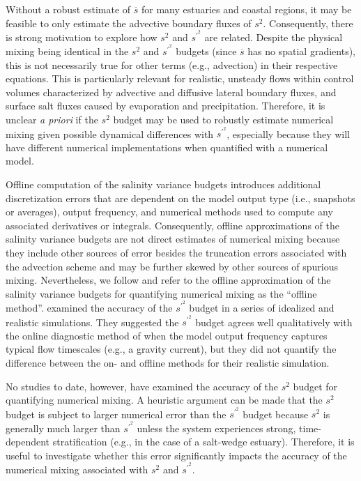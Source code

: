 Without a robust estimate of $\overline{s}$ for many estuaries and coastal regions, it may be feasible to only estimate the advective boundary fluxes of $s^2$. Consequently, there is strong motivation to explore how $s^2$ and $s^{\prime^2}$ are related. Despite the physical mixing being identical in the $s^2$ and $s^{\prime^2}$ budgets (since $\overline{s}$ has no spatial gradients), this is not necessarily true for other terms (e.g., advection) in their respective equations. This is particularly relevant for realistic, unsteady flows within control volumes characterized by advective and diffusive lateral boundary fluxes, and surface salt fluxes caused by evaporation and precipitation. Therefore, it is unclear \textit{a priori} if the $s^2$ budget may be used to robustly estimate numerical mixing given possible dynamical differences with $s^{\prime^2}$, especially because they will have different numerical implementations when quantified with a numerical model.

Offline computation of the salinity variance budgets introduces additional discretization errors that are dependent on the model output type (i.e., snapshots or averages), output frequency, and numerical methods used to compute any associated derivatives or integrals. Consequently, offline approximations of the salinity variance budgets are not direct estimates of numerical mixing because they include other sources of error besides the truncation errors associated with the advection scheme and may be further skewed by other sources of spurious mixing. Nevertheless, we follow \citet{Wang_2021} and refer to the offline approximation of the salinity variance budgets for quantifying numerical mixing as the ``offline method''. \citet{Wang_2021} examined the accuracy of the $s^{\prime^2}$ budget in a series of idealized and realistic simulations. They suggested the $s^{\prime^2}$ budget agrees well qualitatively with the online diagnostic method of \citet{Burchard_2008} when the model output frequency captures typical flow timescales (e.g., a gravity current), but they did not quantify the difference between the on- and offline methods for their realistic simulation.  

No studies to date, however, have examined the accuracy of the $s^2$ budget for quantifying numerical mixing. A heuristic argument can be made that the $s^2$ budget is subject to larger numerical error than the $s^{\prime^2}$ budget because $s^2$ is generally much larger than $s^{\prime^2}$ unless the system experiences strong, time-dependent stratification (e.g., in the case of a salt-wedge estuary). Therefore, it is useful to investigate whether this error significantly impacts the accuracy of the numerical mixing associated with $s^2$ and $s^{\prime^2}$. 

